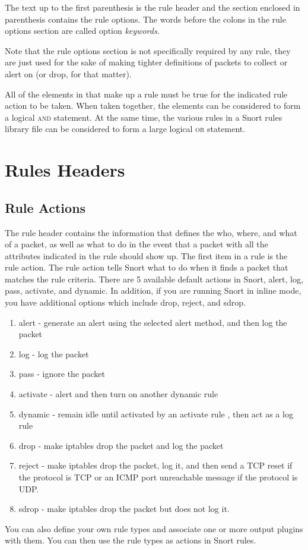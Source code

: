 \documentclass[english]{report}
\newenvironment{note}{
\samepage
    \vspace{10pt}{\textsf{
        {\hspace{7pt}\Huge{$\triangle$\hspace{-12.5pt}{\Large{$^!$}}}}\hspace{5pt}
        {\Large{NOTE}}
    }
    }
   \begin{center}
    \par\vspace{-17pt}

    \begin{lrbox}{\savepar}
    \begin{minipage}[r]{6in}
}
{
    \end{minipage}
    \end{lrbox}
    \fbox{
        \usebox{
            \savepar
	}
    }
    \par\vskip10pt
    \end{center}
}
\newenvironment{note}{
        \begin{rawhtml}
        <p><table border="1"><tr><td><b>
        Note:&nbsp;&nbsp;</b>
        \end{rawhtml}
}{
        \begin{rawhtml}
        </b></td></tr></table></p>
        \end{rawhtml}
}
\begin{document}
The text up to the first parenthesis is the rule header and the section
enclosed in parenthesis contains the rule options. The words before the
colons in the rule options section are called option \emph{keywords}. 

\begin{note}
Note that the rule options section is not specifically required by any
rule, they are just used for the sake of making tighter definitions
of packets to collect or alert on (or drop, for that matter). 
\end{note}

All of the elements in that make up a rule must be true for the indicated
rule action to be taken. When taken together, the elements can be
considered to form a logical \textsc{and} statement. At the same time,
the various rules in a Snort rules library file can be considered
to form a large logical \textsc{or} statement. 


\section{Rules Headers}


\subsection{Rule Actions \label{rules action section}}

The rule header contains the information that defines the who,
where, and what of a packet, as well as what to do in the
event that a packet with all the attributes indicated in the rule
should show up. The first item in a rule is the rule action. The rule
action tells Snort what to do when it finds a packet that matches
the rule criteria. There are 5 available default actions in Snort,
alert, log, pass, activate, and dynamic. In addition, if you are running
Snort in inline mode, you have additional options which include drop, reject, and sdrop. 

\begin{enumerate}
\item alert - generate an alert using the selected alert method, and then
log the packet 
\item log - log the packet 
\item pass - ignore the packet 
\item activate - alert and then turn on another dynamic rule  
\item dynamic - remain idle until activated by an activate rule , then act
as a log rule
\item drop - make iptables drop the packet and log the packet
\item reject - make iptables drop the packet, log it, and then send a 
TCP reset if the protocol is TCP or an ICMP port unreachable message if the 
protocol is UDP.
\item sdrop - make iptables drop the packet but does not log it.
\end{enumerate}
You can also define your own rule types and associate one or more
output plugins with them. You can then use the rule types as actions
in Snort rules.
\end{document}
